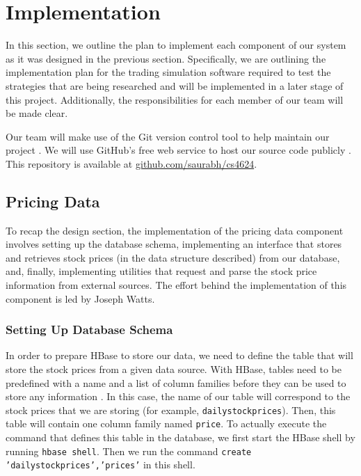 
\section{Implementation}\label{implementation}

In this section, we outline the plan to implement each component of our system as it was designed in the previous section.
Specifically, we are outlining the implementation plan for the trading simulation software required to test the strategies that are being researched and will be implemented in a later stage of this project.
Additionally, the responsibilities for each member of our team will be made clear.

Our team will make use of the Git version control tool to help maintain our project \cite{git}.
We will use GitHub's free web service to host our source code publicly \cite{github}.
This repository is available at \url{github.com/saurabh/cs4624}.

\subsection{Pricing Data}

To recap the design section, the implementation of the pricing data component involves setting up the database schema, implementing an interface that stores and retrieves stock prices (in the data structure described) from our database, and, finally, implementing utilities that request and parse the stock price information from external sources.
The effort behind the implementation of this component is led by Joseph Watts.

\subsubsection{Setting Up Database Schema}

In order to prepare HBase to store our data, we need to define the table that will store the stock prices from a given data source.
With HBase, tables need to be predefined with a name and a list of column families before they can be used to store any information \cite{hbase}.
In this case, the name of our table will correspond to the stock prices that we are storing (for example, \texttt{dailystockprices}).
Then, this table will contain one column family named \texttt{price}.
To actually execute the command that defines this table in the database, we first start the HBase shell by running \texttt{hbase shell}.
Then we run the command \texttt{create 'dailystockprices','prices'} in this shell.


